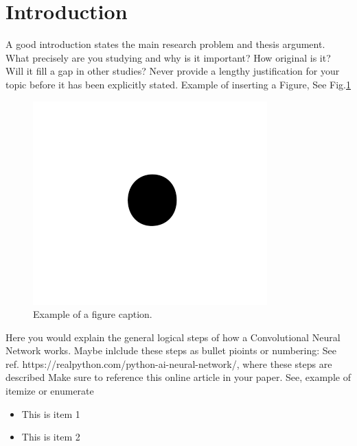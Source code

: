 \documentclass[conference]{IEEEtran}
\begin{document}

\section{Introduction}
A good introduction states the main research problem and thesis argument. What precisely are you studying
and why is it important? How original is it? Will it fill a gap in other studies? Never provide a lengthy
justification for your topic before it has been explicitly stated. Example of inserting a Figure, See Fig.\ref{fig:test_img}
\cite{NNPart1_VZ_2019}


\begin{figure}[h]  %
  \centering
  \includegraphics[scale=0.2]{images/test_image.png}
  \caption{Example of a figure caption.}
  \label{fig:test_img}
\end{figure}

Here you would explain the general logical steps of how a Convolutional Neural Network works. Maybe inlclude these
steps as bullet pioints or numbering:  See ref. https://realpython.com/python-ai-neural-network/, where these steps are described
Make sure to reference this online article in your paper. See, example of itemize or enumerate
\begin{itemize}
\item This is item 1
\item This is item 2
\end{itemize}
\end{document}
